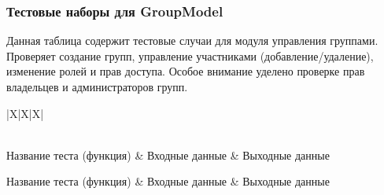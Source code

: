 \subsubsection{Тестовые наборы для GroupModel}

Данная таблица содержит тестовые случаи для модуля управления группами. Проверяет создание групп, управление участниками (добавление/удаление), изменение ролей и прав доступа. Особое внимание уделено проверке прав владельцев и администраторов групп.

\begin{xltabular}{\linewidth}{|X|X|X|}
	\caption{Тестовые наборы для GroupModel\label{groupmodel-tests}}\\ \hline
	\centrow Название теста (функция) & \centrow Входные данные & \centrow Выходные данные \\ \hline
	\endfirsthead
	
	\centrow Название теста (функция) & \centrow Входные данные & \centrow Выходные данные \\ \hline
	\finishhead
	

\end{xltabular}
